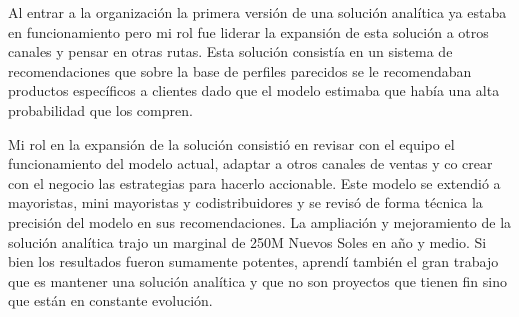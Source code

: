 \documentclass{article}
\begin{document}
Al entrar a la organización la primera versión de una solución analítica ya estaba en funcionamiento pero mi rol fue liderar la expansión de esta solución a otros canales y pensar en otras rutas. Esta solución consistía en un sistema de recomendaciones que sobre la base de perfiles parecidos se le recomendaban productos específicos a clientes dado que el modelo estimaba que había una alta probabilidad que los compren.

Mi rol en la expansión de la solución consistió en revisar con el equipo el funcionamiento del modelo actual, adaptar a otros canales de ventas y co crear con el negocio las estrategias para hacerlo accionable. Este modelo se extendió a mayoristas, mini mayoristas y codistribuidores y se revisó de forma técnica la precisión del modelo en sus recomendaciones. La ampliación y mejoramiento de la solución analítica trajo un marginal de 250M Nuevos Soles en año y medio. Si bien los resultados fueron sumamente potentes, aprendí también el gran trabajo que es mantener una solución analítica y que no son proyectos que tienen fin sino que están en constante evolución. 
\end{document}

